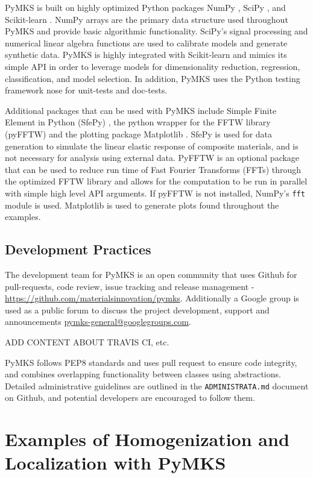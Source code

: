 \documentclass{bmcart}
\begin{document}
PyMKS is built on highly optimized Python packages NumPy \cite{van2011numpy}, SciPy \cite{jones2014scipy}, and Scikit-learn \cite{pedregosa2011scikit}. NumPy arrays are the primary data structure used throughout PyMKS and provide basic algorithmic functionality. SciPy's signal processing and numerical linear algebra functions are used to calibrate models and generate synthetic data. PyMKS is highly integrated with Scikit-learn and mimics its simple API in order to leverage models for dimensionality reduction, regression, classification, and model selection. In addition, PyMKS uses the Python testing framework nose for unit-tests and doc-tests.

Additional packages that can be used with PyMKS include Simple Finite Element in Python (SfePy) \cite{cimrman2014sfepy}, the python wrapper for the FFTW library (pyFFTW) \cite{frigo1998fftw} and the plotting package Matplotlib \cite{hunter2007matplotlib}. SfePy is used for data generation to simulate the linear elastic response of composite materials, and is not necessary for analysis using external data. PyFFTW is an optional package that can be used to reduce run time of Fast Fourier Transforms (FFTs) through the optimized FFTW library and allows for the computation to be run in parallel with simple high level API arguments. If pyFFTW is not installed, NumPy's \texttt{fft} module is used. Matplotlib is used to generate plots found throughout the examples.

\subsection{Development Practices}

The development team for PyMKS is an open community that uses Github for pull-requests, code review, issue tracking and release management - \\ \url{https://github.com/materialsinnovation/pymks}. Additionally a Google group is used as a public forum to discuss the project development, support and announcements \url{pymks-general@googlegroups.com}. 

ADD CONTENT ABOUT TRAVIS CI, etc.

PyMKS follows PEP8 standards and uses pull request to ensure code integrity, and combines overlapping functionality between classes using abstractions. Detailed administrative guidelines are outlined in the \texttt{ADMINISTRATA.md} document on Github, and potential developers are encouraged to follow them. 

\section{Examples of Homogenization and Localization with PyMKS}
\end{document}
